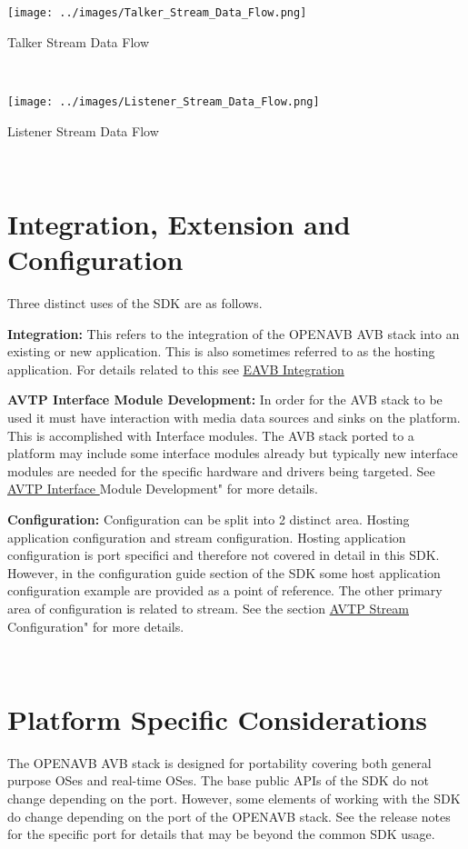 \begin{DoxyImage}
\texttt{[image: ../images/Talker\_Stream\_Data\_Flow.png]}
\caption{Talker Stream Data Flow}
\end{DoxyImage}


~\newline



\begin{DoxyImage}
\texttt{[image: ../images/Listener\_Stream\_Data\_Flow.png]}
\caption{Listener Stream Data Flow}
\end{DoxyImage}


~\newline
\hypertarget{sdk_overview_sdk_overview_integration}{}\section{Integration, Extension and Configuration }\label{sdk_overview_sdk_overview_integration}
Three distinct uses of the S\+DK are as follows.

{\bfseries Integration\+:} This refers to the integration of the O\+P\+E\+N\+A\+VB A\+VB stack into an existing or new application. This is also sometimes referred to as the hosting application. For details related to this see \hyperlink{sdk_integration}{E\+A\+VB Integration}

{\bfseries A\+V\+TP Interface Module Development\+:} In order for the A\+VB stack to be used it must have interaction with media data sources and sinks on the platform. This is accomplished with Interface modules. The A\+VB stack ported to a platform may include some interface modules already but typically new interface modules are needed for the specific hardware and drivers being targeted. See \hyperlink{sdk_avtp_interface_module_dev}{A\+V\+TP Interface }Module Development" for more details.

{\bfseries Configuration\+:} Configuration can be split into 2 distinct area. Hosting application configuration and stream configuration. Hosting application configuration is port specifici and therefore not covered in detail in this S\+DK. However, in the configuration guide section of the S\+DK some host application configuration example are provided as a point of reference. The other primary area of configuration is related to stream. See the section \hyperlink{sdk_avtp_stream_cfg}{A\+V\+TP Stream }Configuration" for more details.

~\newline
\hypertarget{sdk_overview_sdk_overview_platform}{}\section{Platform Specific Considerations }\label{sdk_overview_sdk_overview_platform}
The O\+P\+E\+N\+A\+VB A\+VB stack is designed for portability covering both general purpose O\+Ses and real-\/time O\+Ses. The base public A\+P\+Is of the S\+DK do not change depending on the port. However, some elements of working with the S\+DK do change depending on the port of the O\+P\+E\+N\+A\+VB stack. See the release notes for the specific port for details that may be beyond the common S\+DK usage.

